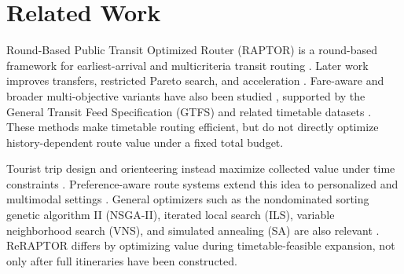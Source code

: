 \section{Related Work}
Round-Based Public Transit Optimized Router (RAPTOR) is a round-based framework
for earliest-arrival and multicriteria transit
routing \cite{delling2015raptor}. Later work improves transfers, restricted
Pareto search, and acceleration
\cite{abuaisha2024transferdb,agarwal2024bicriteriontb,delling2019restrictedpareto,delling2017hyperpartitioning,he2022paretojourneys,phan2019hublabeling}.
Fare-aware and broader multi-objective variants have also been studied
\cite{euler2024price,weng2021mcts}, supported by the General Transit Feed
Specification (GTFS) and related timetable
datasets \cite{godfrid2022mobilitydb,kujala2018datasets,pereira2022gtfs2gps,wong2013leveraginggtfs}.
These methods make timetable routing efficient, but do not directly optimize
history-dependent route value under a fixed total budget.

Tourist trip design and orienteering instead maximize collected value under
time constraints \cite{gavalas2015teamorienteering,gunawan2016survey,ruizmeza2022slr,souffriau2008personalized}.
Preference-aware route systems extend this idea to personalized and multimodal
settings \cite{persia2020socialsensing,pilato2023modular,zhang2025dynamicmultimodal,xia2024integrated}.
General optimizers such as the nondominated sorting genetic algorithm II
(NSGA-II), iterated local search (ILS), variable
neighborhood search (VNS), and simulated annealing (SA) are also relevant
\cite{deb2002nsga2,kirkpatrick1983sa,lourenco2003ils,mladenovic1997vns}.
ReRAPTOR differs by optimizing value during timetable-feasible expansion, not
only after full itineraries have been constructed.

